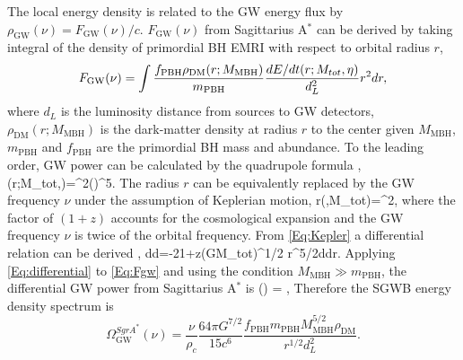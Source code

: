 The local energy density is related to the \ac{GW} energy flux by $\rho_\text{GW}(\nu) = F_\text{GW}(\nu)/c$.
$F_\text{GW}(\nu)$ from Sagittarius A$^\ast$ can be derived by taking integral of the density of primordial \ac{BH} \ac{EMRI} with respect to orbital radius $r$,
\begin{equation} \label{Eq:Fgw}
F_\text{GW}(\nu) = \int{f_\text{PBH}\rho_\text{DM}(r;M_\text{MBH})\over m_\text{PBH}} {dE/dt(r;M_{tot},\eta) \over {d_L^2}}r^2 dr, 
\end{equation}
where $d_L$ is the luminosity distance from sources to \ac{GW} detectors, $\rho_\text{DM}(r;M_\text{MBH})$ is the dark-matter density  at radius $r$ to the center given $M_\text{MBH}$, $m_\text{PBH}$ and $f_\text{PBH}$ are the primordial \ac{BH} mass and abundance.
To the leading order, \ac{GW} power can be calculated by the quadrupole formula \cite{peter1,peter2},
\be
{}(r;M_{tot},\eta)=\eta^2\left(\right)^5.
\ee
The radius $r$ can be equivalently replaced by the \ac{GW} frequency $\nu$ under the assumption of Keplerian motion,
\be\label{Eq:Kepler}
r(\nu,M_{tot})=^{2}, 
\ee
where the factor of $(1+z)$ accounts for the cosmological expansion and the \ac{GW} frequency $\nu$ is twice of the orbital frequency.
From \cref{Eq:Kepler} a differential relation can  be derived ,
\be\label{Eq:differential}
{d\over d\nu}=-{2\pi{}}{1+z\over (GM_{tot})^{1/2}} r^{5/2}{d\over dr}.
\ee
Applying \cref{Eq:differential} to \cref{Eq:Fgw} and using the condition $M_\text{MBH}\gg m_\text{PBH}$, the differential \ac{GW} power from Sagittarius A$^\ast$ is
\be\label{Eq:dFoverdnu}
(\nu) =  ,
\ee
Therefore the \ac{SGWB} energy density spectrum is
\begin{equation}\label{Eq:SgrA}
\Omega_\textrm{GW}^{Sgr A^{\ast}}(\nu) = \frac{\nu}{\rho_c}\frac{64\pi G^{7/2}}{15c^6} \frac{f_\textrm{PBH} m_\textrm{PBH} M_\text{MBH}^{5/2} \rho_\textrm{DM}}{ r^{1/2} d_L^2}.
\end{equation}

